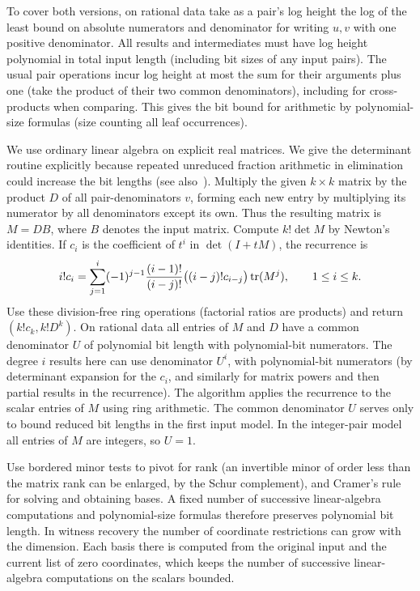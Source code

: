 To cover both versions, on rational data take as a pair's log height
the log of the least bound on absolute numerators and denominator
for writing \(u,v\) with one positive denominator.
All results and intermediates must have log height polynomial
in total input length (including bit sizes of any input pairs).
The usual pair operations incur log height at most the sum for their
arguments plus one (take the product of their two common denominators),
including for cross-products when comparing.
This gives the bit bound for arithmetic by polynomial-size formulas
(size counting all leaf occurrences).

We use ordinary linear algebra on explicit real matrices.
We give the determinant routine explicitly because repeated unreduced
fraction arithmetic in elimination could increase the bit lengths
(see also~\cite[\S1.4]{GLS}).
Multiply the given \(k\times k\) matrix by the product \(D\)
of all pair-denominators \(v\), forming each new entry by multiplying its numerator
by all denominators except its own. Thus the resulting matrix is
\(M=D B\), where \(B\) denotes the input matrix. Compute \(k!\det M\)
by Newton's identities. If \(c_i\) is the coefficient of \(t^i\)
in \(\det(I+tM)\), the recurrence is
\[
 i!c_i=\sum_{j=1}^i (-1)^{j-1}
 \frac{(i-1)!}{(i-j)!}
 \big((i-j)!c_{i-j}\big)\operatorname{tr}(M^j),\qquad 1\le i\le k.
\]
Use these division-free ring operations (factorial ratios are
products) and return \((k!c_k,k!D^k)\).
On rational data all entries of \(M\) and \(D\) have
a common denominator \(U\) of polynomial bit length with
polynomial-bit numerators. The degree \(i\) results here
can use denominator \(U^i\), with polynomial-bit numerators
(by determinant expansion for the \(c_i\), and similarly for
matrix powers and then partial results in the recurrence).
The algorithm applies the recurrence to the scalar entries of \(M\)
using ring arithmetic. The common denominator \(U\) serves only to bound
reduced bit lengths in the first input model. In the integer-pair model
all entries of \(M\) are integers, so \(U=1\).

Use bordered minor tests to pivot for rank (an invertible minor of
order less than the matrix rank can be enlarged, by the Schur
complement), and Cramer's rule for solving and obtaining bases.
A fixed number of successive linear-algebra computations and
polynomial-size formulas therefore preserves polynomial bit length.
In witness recovery the number of coordinate restrictions can grow with
the dimension. Each basis there is computed from the original input and
the current list of zero coordinates, which keeps the number of successive
linear-algebra computations on the scalars bounded.

